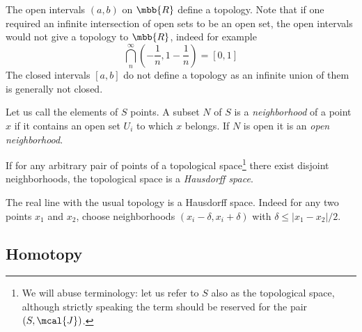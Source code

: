 \documentclass[10pt,reqno]{amsart}
\numberwithin{equation}{section}
\begin{document}
\begin{example}
	The open intervals $(a,b)$ on $\mbb{R}$ define a topology. Note 
	that if one required an infinite intersection of open sets to 
	be an open set, the open intervals would not give a topology to 
	$\mbb{R}$, indeed for example
	\begin{displaymath}
		\bigcap_n^\infty \left( -\frac{1}{n}, 1-\frac{1}{n} \right) = 
		[0,1]
	\end{displaymath}
	The closed intervals $[a,b]$ do not define a topology as an 
	infinite union of them is generally not closed.
\end{example}
%

Let us call the elements of $S$ points. A subset $N$ of $S$ is a 
\emph{neighborhood} of a point $x$ if it contains an open set 
$U_i$ to which $x$ belongs. If $N$ is open it is an \emph{open 
	neighborhood}. 

If for any arbitrary pair of points of a topological 
space\footnote{We will abuse terminology: let us refer to $S$ 
	also as the topological space, although strictly speaking the 
	term should be reserved for the pair $(S,\mcal{J})$.} there 
exist disjoint neighborhoods, the topological space is a 
\emph{Hausdorff space}.

\begin{example}
	The real line with the usual topology is a Hausdorff space.  
	Indeed for any two points $x_1$ and $x_2$, choose neighborhoods 
	$(x_i-\delta,x_i+\delta)$ with $\delta \leqslant |x_1 - 
	x_2|/2$.
\end{example}

\subsection{Homotopy}
\end{document}

